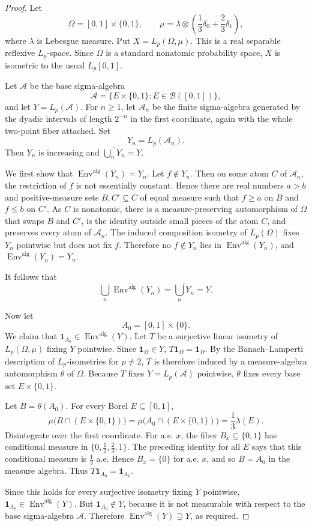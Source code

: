 \documentclass[11pt]{article}
\newcommand{\Env}{\operatorname{Env}}
\newcommand{\alg}{\mathrm{alg}}
\newcommand{\borel}{\mathcal B}
\begin{document}
\begin{proof}
Let
\[
  \Omega=[0,1]\times\{0,1\},\qquad
  \mu=\lambda\otimes\left(\frac13\delta_0+\frac23\delta_1\right),
\]
where \(\lambda\) is Lebesgue measure.  Put \(X=L_p(\Omega,\mu)\).  This is a
real separable reflexive \(L_p\)-space.  Since \(\Omega\) is a standard nonatomic
probability space, \(X\) is isometric to the usual \(L_p[0,1]\).

Let \(\mathcal A\) be the base sigma-algebra
\[
  \mathcal A=\{E\times\{0,1\}:E\in\borel([0,1])\},
\]
and let \(Y=L_p(\mathcal A)\).  For \(n\ge 1\), let \(\mathcal A_n\) be the
finite sigma-algebra generated by the dyadic intervals of length \(2^{-n}\) in
the first coordinate, again with the whole two-point fiber attached.  Set
\[
  Y_n=L_p(\mathcal A_n).
\]
Then \(Y_n\) is increasing and \(\overline{\bigcup_nY_n}=Y\).

We first show that \(\Env^{\alg}(Y_n)=Y_n\).  Let \(f\notin Y_n\).  Then on
some atom \(C\) of \(\mathcal A_n\), the restriction of \(f\) is not essentially
constant.  Hence there are real numbers \(a>b\) and positive-measure sets
\(B,C'\subseteq C\) of equal measure such that \(f\ge a\) on \(B\) and
\(f\le b\) on \(C'\).  As \(C\) is nonatomic, there is a measure-preserving
automorphism of \(\Omega\) that swaps \(B\) and \(C'\), is the identity outside
small pieces of the atom \(C\), and preserves every atom of \(\mathcal A_n\).
The induced composition isometry of \(L_p(\Omega)\) fixes \(Y_n\) pointwise but
does not fix \(f\).  Therefore no \(f\notin Y_n\) lies in
\(\Env^{\alg}(Y_n)\), and \(\Env^{\alg}(Y_n)=Y_n\).

It follows that
\[
  \overline{\bigcup_n\Env^{\alg}(Y_n)}
  =
  \overline{\bigcup_nY_n}
  =
  Y.
\]

Now let
\[
  A_0=[0,1]\times\{0\}.
\]
We claim that \(\mathbf 1_{A_0}\in \Env^{\alg}(Y)\).  Let \(T\) be a surjective
linear isometry of \(L_p(\Omega,\mu)\) fixing \(Y\) pointwise.  Since
\(\mathbf 1_\Omega\in Y\), \(T\mathbf 1_\Omega=\mathbf 1_\Omega\).  By the
Banach--Lamperti description of \(L_p\)-isometries for \(p\ne2\), \(T\) is
therefore induced by a measure-algebra automorphism \(\theta\) of \(\Omega\).
Because \(T\) fixes \(Y=L_p(\mathcal A)\) pointwise, \(\theta\) fixes every
base set \(E\times\{0,1\}\).

Let \(B=\theta(A_0)\).  For every Borel \(E\subseteq[0,1]\),
\[
  \mu\bigl(B\cap(E\times\{0,1\})\bigr)
  =
  \mu\bigl(A_0\cap(E\times\{0,1\})\bigr)
  =
  \frac13\lambda(E).
\]
Disintegrate over the first coordinate.  For a.e. \(x\), the fiber
\(B_x\subseteq\{0,1\}\) has conditional measure in
\(\{0,\frac13,\frac23,1\}\).  The preceding identity for all \(E\) says that
this conditional measure is \(\frac13\) a.e.  Hence \(B_x=\{0\}\) for a.e.
\(x\), and so \(B=A_0\) in the measure algebra.  Thus \(T\mathbf 1_{A_0}
=\mathbf 1_{A_0}\).

Since this holds for every surjective isometry fixing \(Y\) pointwise,
\(\mathbf 1_{A_0}\in\Env^{\alg}(Y)\).  But \(\mathbf 1_{A_0}\notin Y\), because
it is not measurable with respect to the base sigma-algebra \(\mathcal A\).
Therefore \(\Env^{\alg}(Y)\supsetneq Y\), as required.
\end{proof}
\end{document}
